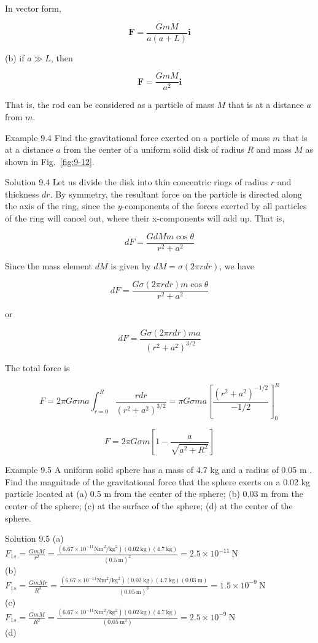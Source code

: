 \documentclass[10pt]{article}
\numberwithin{equation}{section}
\begin{document}
In vector form,

$$
\mathbf{F}=\frac{G m M}{a(a+L)} \mathbf{i}
$$

(b) if $a \gg L$, then

$$
\mathbf{F}=\frac{G m M}{a^{2}} \mathbf{i}
$$

That is, the rod can be considered as a particle of mass $M$ that is at a distance $a$ from $m$.

Example 9.4 Find the gravitational force exerted on a particle of mass $m$ that is at a distance $a$ from the center of a uniform solid disk of radius $R$ and mass $M$ as shown in Fig.~\ref{fig:9-12}.

Solution 9.4 Let us divide the disk into thin concentric rings of radius $r$ and thickness $d r$. By symmetry, the resultant force on the particle is directed along the axis of the ring, since the $y$-components of the forces exerted by all particles of the ring will cancel out, where their x-components will add up. That is,

$$
d F=\frac{G d M m \cos \theta}{r^{2}+a^{2}}
$$

Since the mass element $d M$ is given by $d M=\sigma(2 \pi r d r)$, we have

$$
d F=\frac{G \sigma(2 \pi r d r) m \cos \theta}{r^{2}+a^{2}}
$$

or

$$
d F=\frac{G \sigma(2 \pi r d r) m a}{\left(r^{2}+a^{2}\right)^{3 / 2}}
$$

The total force is

$$
F=2 \pi G \sigma m a \int_{r=0}^{R} \frac{r d r}{\left(r^{2}+a^{2}\right)^{3 / 2}}=\pi G \sigma m a\left[\frac{\left(r^{2}+a^{2}\right)^{-1 / 2}}{-1 / 2}\right]_{0}^{R}
$$

$$
F=2 \pi G \sigma m\left[1-\frac{a}{\sqrt{a^{2}+R^{2}}}\right]
$$

Example 9.5 A uniform solid sphere has a mass of 4.7 kg and a radius of 0.05 m . Find the magnitude of the gravitational force that the sphere exerts on a 0.02 kg particle located at (a) 0.5 m from the center of the sphere; (b) 0.03 m from the center of the sphere; (c) at the surface of the sphere; (d) at the center of the sphere.

Solution 9.5 (a)\\
$F_{1 s}=\frac{G m M}{r^{2}}=\frac{\left(6.67 \times 10^{-11} \mathrm{Nm}^{2} / \mathrm{kg}^{2}\right)(0.02 \mathrm{~kg})(4.7 \mathrm{~kg})}{(0.5 \mathrm{~m})^{2}}=2.5 \times 10^{-11} \mathrm{~N}$\\
(b)\\
$F_{1 s}=\frac{G m M r}{R^{3}}=\frac{\left(6.67 \times 10^{-11} \mathrm{Nm}^{2} / \mathrm{kg}^{2}\right)(0.02 \mathrm{~kg})(4.7 \mathrm{~kg})(0.03 \mathrm{~m})}{(0.05 \mathrm{~m})^{3}}=1.5 \times 10^{-9} \mathrm{~N}$\\
(c)\\
$F_{1 s}=\frac{G m M}{R^{2}}=\frac{\left(6.67 \times 10^{-11} \mathrm{Nm}^{2} / \mathrm{kg}^{2}\right)(0.02 \mathrm{~kg})(4.7 \mathrm{~kg})}{\left(0.05 \mathrm{~m}^{2}\right)}=2.5 \times 10^{-9} \mathrm{~N}$\\
(d)
\end{document}

